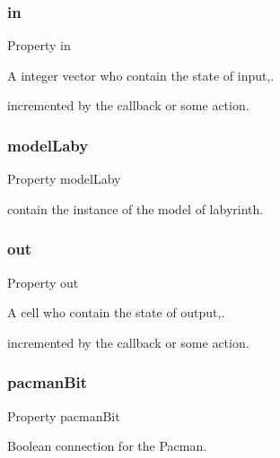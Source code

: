 \subsubsection{\texorpdfstring{in}{in}}
{\footnotesize\ttfamily Property in}



A integer vector who contain the state of input,. 

incremented by the callback or some action. \mbox{\label{class_wrapper_a65b2390d6d3e36b42ee0ea886a562d5c}} 
\subsubsection{\texorpdfstring{model\+Laby}{modelLaby}}
{\footnotesize\ttfamily Property model\+Laby}



contain the instance of the model of labyrinth. 

\mbox{\label{class_wrapper_a8fcb5c64317d463be34f501200a2f49a}} 
\subsubsection{\texorpdfstring{out}{out}}
{\footnotesize\ttfamily Property out}



A cell who contain the state of output,. 

incremented by the callback or some action. \mbox{\label{class_wrapper_abf190bfcb1e7ec7573c4e002d30cb125}} 
\subsubsection{\texorpdfstring{pacman\+Bit}{pacmanBit}}
{\footnotesize\ttfamily Property pacman\+Bit}



Boolean connection for the Pacman. 

\mbox{\label{class_wrapper_ab453e11b3a41f7ef03be604bb5182e76}} 
